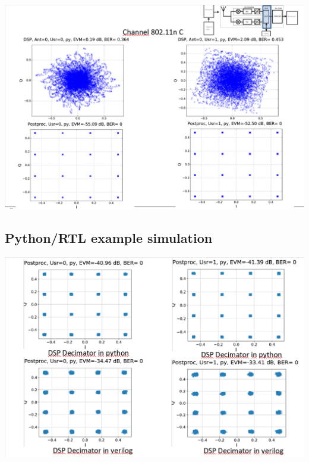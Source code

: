 \documentclass{sdkslides}
\begin{document}
\subsection*{\sectionname}
\begin{frame}[c]
    \includegraphics[width=\textwidth]{Pics/DSP-example-fader2-ideal.png}
\end{frame}

\renewcommand{\sectionname}{Python/RTL example simulation}
\subsection*{\sectionname}
\begin{frame}[c]
    \begin{center}
        \includegraphics[width=\textwidth]{Pics/DSP-example-fader2-decimator_effect.png}
    \end{center}
\end{frame}
\end{document}
